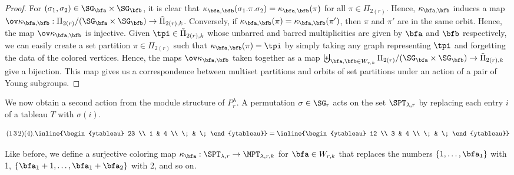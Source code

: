 \begin{proof}

For $(\sigma_1,\sigma_2)\in \SG_\bfa\times\SG_\bfb$, it is clear that $\kappa_{\bfa,\bfb}(\sigma_1.\pi.\sigma_2)=\kappa_{\bfa,\bfb}(\pi)$ for all $\pi\in\Pi_{2(r)}$. Hence, $\kappa_{\bfa,\bfb}$ induces a map $\ov\kappa_{\bfa,\bfb}:\Pi_{2(r)}/(\SG_\bfa\times\SG_\bfb)\rightarrow\tilde\Pi_{2(r),k}$. Conversely, if $\kappa_{\bfa,\bfb}(\pi)=\kappa_{\bfa,\bfb}(\pi')$, then $\pi$ and $\pi'$ are in the same orbit. Hence, the map $\ov\kappa_{\bfa,\bfb}$ is injective. Given $\tpi\in\tilde\Pi_{2(r),k}$ whose unbarred and barred multiplicities are given by $\bfa$ and $\bfb$ respectively, we can easily create a set partition $\pi\in\Pi_{2(r)}$ such that $\kappa_{\bfa,\bfb}(\pi)=\tpi$ by simply taking any graph representing $\tpi$ and forgetting the data of the colored vertices. Hence, the maps $\ov\kappa_{\bfa,\bfb}$ taken together as a map $\biguplus_{\bfa,\bfb\in W_{r,k}} \Pi_{2(r)}/(\SG_\bfa\times\SG_\bfb)\to\tilde\Pi_{2(r),k}$ give a bijection. This map gives us a correspondence between multiset partitions and orbits of set partitions under an action of a pair of Young subgroups.
\end{proof}

We now obtain a second action from the module structure of $P_r^\lambda$. A permutation $\sigma\in\SG_r$ acts on the set $\SPT_{\lambda,r}$ by replacing each entry $i$ of a tableau $T$ with $\sigma(i)$.

\begin{exam}
    \[(1\,3\,2)(4).\inline{\begin{ytableau}
        23 \\
        1 & 4 \\
        \; & \;
    \end{ytableau}}=\inline{\begin{ytableau}
        12 \\
        3 & 4 \\
        \; & \;
    \end{ytableau}}\]
\end{exam}

Like before, we define a surjective coloring map $\kappa_\bfa:\SPT_{\lambda,r}\to\MPT_{\lambda,r,k}$ for $\bfa\in W_{r,k}$ that replaces the numbers $\{1,\dots,\bfa_1\}$ with 1, $\{\bfa_1+1,\dots,\bfa_1+\bfa_2\}$ with 2, and so on.

